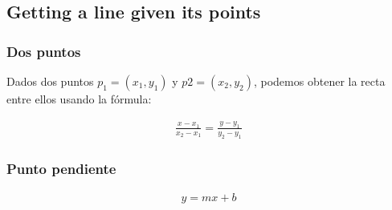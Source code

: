 \subsection{Getting a line given its points}

\subsubsection{Dos puntos}

Dados dos puntos \( p_1 = (x_1, y_1) \) y \( p2 = (x_2, y_2) \), podemos obtener la recta entre ellos usando la fórmula:

\begin{align}
    \frac{x-x_1}{x_2 - x_1} = \frac{y-y_1}{y_2 - y_1} \nonumber
\end{align}

\subsubsection{Punto pendiente}

\begin{align}
    y = mx + b \nonumber
\end{align}